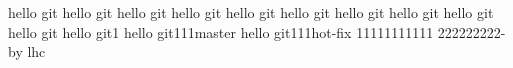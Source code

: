 hello git
hello git
hello git
hello git
hello git
hello git
hello git
hello git
hello git
hello git
hello git1
hello git111master
hello git111hot-fix
11111111111
222222222-by lhc
